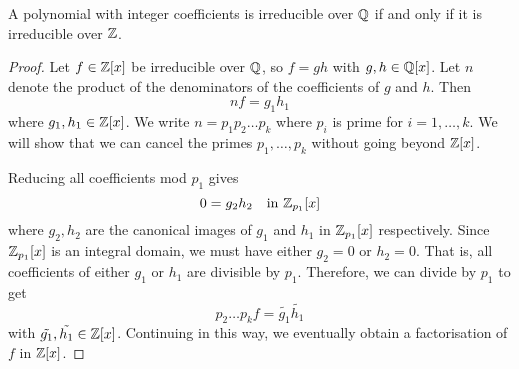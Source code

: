 \begin{lemma}[Gauss]
	A polynomial with integer coefficients is irreducible over $\mathbb{Q}$ if and only if it is irreducible over $\mathbb{Z}$.
	\begin{proof}
		Let $f \in \mathbb{Z}[x]$ be irreducible over $\mathbb{Q}$, so $f = gh$ with $g, h \in \mathbb{Q}[x]$. Let $n$ denote the product of the denominators of the coefficients of $g$ and $h$. Then
		\[
			nf = g_1 h_1
		\]
		where $g_1, h_1 \in \mathbb{Z}[x]$. We write $n = p_1 p_2 \dots p_k$ where $p_i$ is prime for $i = 1, \dots, k$. We will show that we can cancel the primes $p_1, \dots, p_k$ without going beyond $\mathbb{Z}[x]$.
		
		Reducing all coefficients mod $p_1$ gives
		\[
			0 = g_2 h_2 \quad \text{in } \mathbb{Z}_{p_1}[x]
		\]
		where $g_2, h_2$ are the canonical images of $g_1$ and $h_1$ in $\mathbb{Z}_{p_1}[x]$ respectively. Since $\mathbb{Z}_{p_1}[x]$ is an integral domain, we must have either $g_2 = 0$ or $h_2 = 0$. That is, all coefficients of either $g_1$ or $h_1$ are divisible by $p_1$. Therefore, we can divide by $p_1$ to get
		\[
			p_2 \dots p_k f = \tilde{g_1}\tilde{h_1}
		\]
		with $\tilde{g_1}, \tilde{h_1} \in \mathbb{Z}[x]$. Continuing in this way, we eventually obtain a factorisation of $f$ in $\mathbb{Z}[x]$.
	\end{proof}
\end{lemma}

